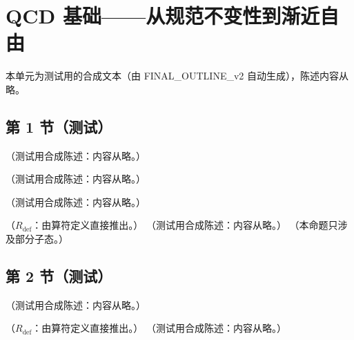 \chapter{QCD 基础——从规范不变性到渐近自由}\label{ch:qcd}
本单元为测试用的合成文本（由 FINAL\_OUTLINE\_v2 自动生成），陈述内容从略。

\section{第 1 节（测试）}\label{sec:qcd-why}

\begin{definition}\label{def:qcd-gauge-group}
（测试用合成陈述：内容从略。）
\end{definition}

\begin{lemma}[色代数恒等式]\label{lem:qcd-colour-identities}
（测试用合成陈述：内容从略。）
\end{lemma}

\begin{example}[单圈图的色因子与双线记号]\label{ex:qcd-colour-algebra}
（测试用合成陈述：内容从略。）
\end{example}

\begin{proposition}\label{prop:qcd-covariance}
（$R_{\mathrm{def}}$：由算符定义直接推出。）
（测试用合成陈述：内容从略。）
（本命题只涉及部分子态。）
\end{proposition}

\section{第 2 节（测试）}\label{sec:qcd-gauge}

\begin{definition}\label{def:prelim-qcd}
（测试用合成陈述：内容从略。）
\end{definition}

\begin{theorem}\label{thm:qcd-gauge-invariance}
（$R_{\mathrm{def}}$：由算符定义直接推出。）
（测试用合成陈述：内容从略。）
\end{theorem}

